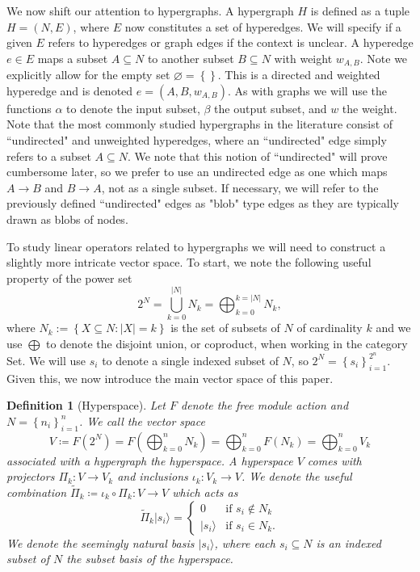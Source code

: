 \documentclass{article}
\newcommand{\ket}[1]{|#1\rangle}
\newcommand{\parens}[1]{\left( #1 \right)}
\newcommand{\set}[1]{\left\{ #1 \right\}}
\newcommand{\fullProj}{\widetilde{\Pi}}
\newcommand{\basei}{\ket{s_i}}
\newtheorem{defn}{Definition}
\begin{document}
We now shift our attention to hypergraphs. A hypergraph $H$ is defined as a tuple $H = (N, E)$, where $E$ now constitutes a set of hyperedges. We will specify if a given $E$ refers to hyperedges or graph edges if the context is unclear. A hyperedge $e \in E$ maps a subset $A \subseteq N$ to another subset $B \subseteq N$ with weight $w_{A, B}$. Note we explicitly allow for the empty set $\varnothing = \set{}$. This is a directed and weighted hyperedge and is denoted $e = (A, B, w_{A,B})$. As with graphs we will use the functions $\alpha$ to denote the input subset, $\beta$ the output subset, and $w$ the weight. Note that the most commonly studied hypergraphs in the literature consist of ``undirected" and unweighted hyperedges, where an ``undirected" edge simply refers to a subset $A \subseteq N$. We note that this notion of ``undirected" will prove cumbersome later, so we prefer to use an undirected edge as one which maps $A \to B$ and $B \to A$, not as a single subset. If necessary, we will refer to the previously defined ``undirected" edges as "blob" type edges as they are typically drawn as blobs of nodes.



To study linear operators related to hypergraphs we will need to construct a slightly more intricate vector space. To start, we note the following useful property of the power set 
\begin{equation}
    2^N =  \bigcup_{k=0}^{|N|} N_k = \bigoplus_{k=0}^{k = |N|} N_k,
\end{equation}
where $N_k := \set{X \subseteq N : |X| = k}$ is the set of subsets of $N$ of cardinality $k$ and we use $\bigoplus$ to denote the disjoint union, or coproduct, when working in the category Set. We will use $s_i$ to denote a single indexed subset of $N$, so $2^N = \set{s_i}_{i=1}^{2^n}$. Given this, we now introduce the main vector space of this paper.

\begin{defn}[Hyperspace]
    Let $F$ denote the free module action and $N = \set{n_i}_{i=1}^n$. We call the vector space $$V \coloneqq F \parens{2^N} = F \parens{\bigoplus_{k=0}^n N_k} = \bigoplus_{k=0}^n F(N_k) = \bigoplus_{k=0}^n V_k $$ associated with a hypergraph the hyperspace. A hyperspace $V$ comes with projectors $\Pi_k : V \to V_k$ and inclusions $\iota_k : V_k \to V$. We denote the useful combination $\fullProj_k \coloneqq \iota_k \circ \Pi_k : V \to V$ which acts as
    \begin{equation}
        \fullProj_k \basei = \begin{cases}
            0 & \text{if } s_i \notin N_k \\
            \basei & \text{if } s_i \in N_k .
        \end{cases}
    \end{equation} We denote the seemingly natural basis $\basei$, where each $s_i \subseteq N$ is an indexed subset of $N$ the subset basis of the hyperspace.
\end{defn}
\end{document}
